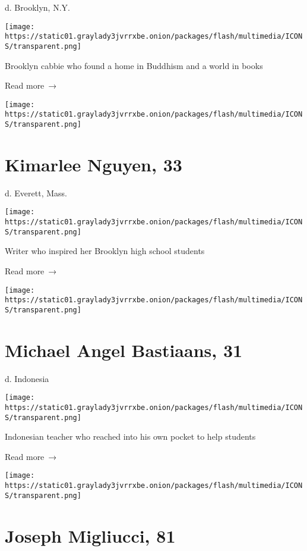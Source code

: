 d. Brooklyn, N.Y.

\texttt{[image: https://static01.graylady3jvrrxbe.onion/packages/flash/multimedia/ICONS/transparent.png]}

Brooklyn cabbie who found a home in Buddhism and a world in books

 Read more~→

\href{https://www.nytimes3xbfgragh.onion/2020/04/15/obituaries/kimarlee-nguyen-dead-coronavirus.html}{}

\texttt{[image: https://static01.graylady3jvrrxbe.onion/packages/flash/multimedia/ICONS/transparent.png]}

\hypertarget{kimarlee-nguyen-33}{%
\section{Kimarlee Nguyen, 33}\label{kimarlee-nguyen-33}}

d. Everett, Mass.

\texttt{[image: https://static01.graylady3jvrrxbe.onion/packages/flash/multimedia/ICONS/transparent.png]}

Writer who inspired her Brooklyn high school students

 Read more~→

\href{https://www.nytimes3xbfgragh.onion/2020/04/15/obituaries/bastiaans-dead-coronavirus.html}{}

\texttt{[image: https://static01.graylady3jvrrxbe.onion/packages/flash/multimedia/ICONS/transparent.png]}

\hypertarget{michael-angel-bastiaans-31}{%
\section{Michael Angel Bastiaans, 31}\label{michael-angel-bastiaans-31}}

d. Indonesia

\texttt{[image: https://static01.graylady3jvrrxbe.onion/packages/flash/multimedia/ICONS/transparent.png]}

Indonesian teacher who reached into his own pocket to help students

 Read more~→

\href{https://www.nytimes3xbfgragh.onion/2020/04/14/obituaries/joseph-migliucci-dead-coronavirus.html}{}

\texttt{[image: https://static01.graylady3jvrrxbe.onion/packages/flash/multimedia/ICONS/transparent.png]}

\hypertarget{joseph-migliucci-81}{%
\section{Joseph Migliucci, 81}\label{joseph-migliucci-81}}

